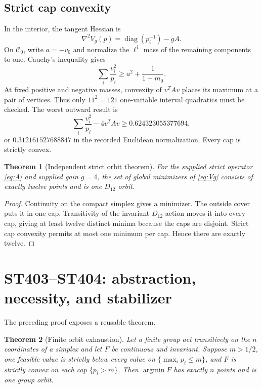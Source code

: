 \documentclass[11pt,a4paper]{article}
\newtheorem{theorem}{Theorem}
\begin{document}
\subsection{Strict cap convexity}

In the interior, the tangent Hessian is
\[
 \nabla^2V_g(p)=\operatorname{diag}(p_i^{-1})-gA.
\]
On $\mathcal C_0$, write $a=-v_0$ and normalize the $\ell^1$ mass of the remaining
components to one.  Cauchy's inequality gives
\[
 \sum_i\frac{v_i^2}{p_i}\ge a^2+\frac1{1-m_0}.
\]
At fixed positive and negative masses, convexity of $v^TAv$ places its maximum at
a pair of vertices.  Thus only $11^2=121$ one-variable interval quadratics must be
checked.  The worst outward result is
\[
 \sum_i\frac{v_i^2}{p_i}-4v^TAv\ge0.624323055377694,
\]
or $0.312161527688847$ in the recorded Euclidean normalization.  Every cap is
strictly convex.

\begin{theorem}[Independent strict orbit theorem]\label{thm:orbit}
For the supplied strict operator \eqref{eq:A} and supplied gain $g=4$, the set of
global minimizers of \eqref{eq:Vg} consists of exactly twelve points and is one
$D_{12}$ orbit.
\end{theorem}
\begin{proof}
Continuity on the compact simplex gives a minimizer.  The outside cover puts it in
one cap.  Transitivity of the invariant $D_{12}$ action moves it into every cap,
giving at least twelve distinct minima because the caps are disjoint.  Strict cap
convexity permits at most one minimum per cap.  Hence there are exactly twelve.
\end{proof}

\section{ST403--ST404: abstraction, necessity, and stabilizer}

The preceding proof exposes a reusable theorem.

\begin{theorem}[Finite orbit exhaustion]\label{thm:abstract}
Let a finite group act transitively on the $n$ coordinates of a simplex and let
$F$ be continuous and invariant.  Suppose $m>1/2$, one feasible value is strictly
below every value on $\{\max_i p_i\le m\}$, and $F$ is strictly convex on each cap
$\{p_i>m\}$.  Then $\operatorname{argmin}F$ has exactly $n$ points and is one group
orbit.
\end{theorem}
\end{document}
